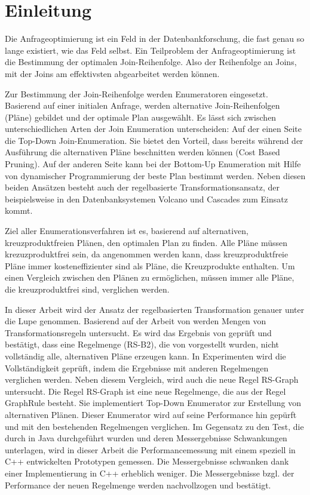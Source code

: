 \chapter{Einleitung}


Die Anfrageoptimierung ist ein Feld in der Datenbankforschung, die fast genau so lange existiert, wie das Feld selbst. Ein Teilproblem der Anfrageoptimierung ist die Bestimmung der optimalen Join-Reihenfolge. Also der Reihenfolge an Joins, mit der Joins am effektivsten abgearbeitet werden können.

Zur Bestimmung der Join-Reihenfolge werden Enumeratoren eingesetzt. Basierend auf einer initialen Anfrage, werden alternative Join-Reihenfolgen (Pläne) gebildet und der optimale Plan ausgewählt. Es lässt sich zwischen unterschiedlichen Arten der Join Enumeration unterscheiden: Auf der einen Seite die Top-Down Join-Enumeration. Sie bietet den Vorteil, dass bereits während der Ausführung die alternativen Pläne beschnitten werden können (Cost Based Pruning). Auf der anderen Seite kann bei der Bottom-Up Enumeration mit Hilfe von dynamischer Programmierung der beste Plan bestimmt werden. Neben diesen beiden Ansätzen besteht auch der regelbasierte Transformationsansatz, der beispielsweise in den Datenbanksystemen Volcano und Cascades zum Einsatz kommt.

Ziel aller Enumerationsverfahren ist es, basierend auf alternativen, kreuzproduktfreien Plänen, den optimalen Plan zu finden. Alle Pläne müssen krezuzproduktfrei sein, da angenommen werden kann, dass kreuzproduktfreie Pläne immer kosteneffizienter sind als Pläne, die Kreuzprodukte enthalten. Um einen Vergleich zwischen den Plänen zu ermöglichen, müssen immer alle Pläne, die kreuzproduktfrei sind, verglichen werden.




In dieser Arbeit wird der Ansatz der regelbasierten Transformation genauer unter die Lupe genommen. Basierend auf der Arbeit von \cite{shanbhag2014optimizing} werden Mengen von Transformationsregeln untersucht. Es wird das Ergebnis von \cite{shanbhag2014optimizing} geprüft und bestätigt, dass eine Regelmenge (RS-B2), die von \cite{pellenkoft1997complexity} vorgestellt wurden, nicht vollständig alle, alternativen Pläne erzeugen kann. In Experimenten wird die Vollständigkeit geprüft, indem die Ergebnisse mit anderen Regelmengen verglichen werden. Neben diesem Vergleich, wird auch die neue Regel RS-Graph untersucht. Die Regel RS-Graph ist eine neue Regelmenge, die aus der Regel GraphRule besteht. Sie implementiert Top-Down Enumerator zur Erstellung von alternativen Plänen. Dieser Enumerator wird auf seine Performance hin gepürft und mit den bestehenden Regelmengen verglichen. Im Gegensatz zu den Test, die durch \cite{shanbhag2014optimizing} in Java durchgeführt wurden und deren Messergebnisse Schwankungen unterlagen, wird in dieser Arbeit die Performancemessung mit einem speziell in C++ entwickelten Prototypen gemessen. Die Messergebnisse schwanken dank einer Implementierung in C++ erheblich weniger. Die Messergebnisse bzgl. der Performance der neuen Regelmenge werden nachvollzogen und bestätigt.





